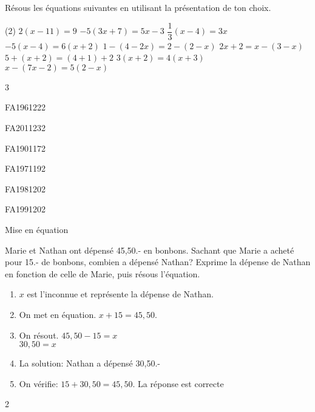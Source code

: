 \documentclass[a4paper,11pt]{report}
\begin{document}
\begin{exo}
    {Résous les équations suivantes en utilisant la présentation de ton choix.
\begin{tasks}(2)
\task $2(x-11)=9$
\task $-5(3x+7)=5x-3$
\task $\dfrac{1}{3}(x-4)=3x$
\task $-5(x-4)=6(x+2)$
\task $1-(4-2x)=2-(2-x)$
\task $2x+2=x-(3-x)$
\task $5+(x+2)=(4+1)+2$
\task $3(x+2)=4(x+3)$
\task $x-(7x-2)=5(2-x)$
\end{tasks} }
{3}
\end{exo}

\begin{exof}{FA196}{122}{2}  
\end{exof}

\begin{exof}{FA201}{123}{2}
\end{exof}


\begin{exol}{FA190}{117}{2}
\end{exol}

\begin{exol}{FA197}{119}{2}
\end{exol}

\begin{exol}{FA198}{120}{2}
\end{exol}
\begin{exol}{FA199}{120}{2}
\end{exol}


\begin{resolu}{Mise en équation}{Marie et Nathan ont dépensé 45,50.- en bonbons. Sachant que Marie a acheté pour 15.- de bonbons, combien a dépensé Nathan? 
Exprime la dépense de Nathan en fonction de celle de Marie, puis résous l'équation.\\

\begin{enumerate}
    \item $x$ est l'inconnue et représente la dépense de Nathan.
    \item On met en équation. $x+15=45,50$.
    \item On résout. $45,50-15=x$\\
    $30,50=x$
    \item La solution: Nathan a dépensé 30,50.-
    \item On vérifie: $15 + 30,50=45,50$. La réponse est correcte
\end{enumerate}
}
{2}
\end{resolu}
\end{document}
